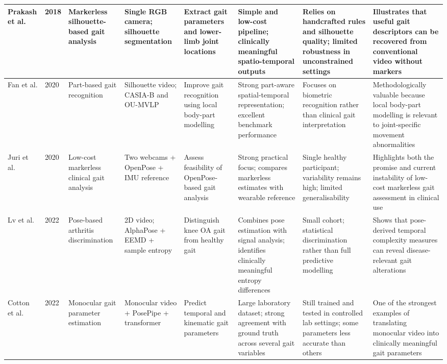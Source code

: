 \documentclass[12pt]{elsarticle}
\begin{document}
{\begin{longtable}{p{1.8cm} p{0.8cm} p{1.4cm} p{1.8cm} p{2.0cm} p{2.2cm} p{2.2cm} p{3.3cm}}
Prakash et al. \cite{prakash2018vision}
& 2018
& Markerless silhouette-based gait analysis
& Single RGB camera; silhouette segmentation
& Extract gait parameters and lower-limb joint locations
& Simple and low-cost pipeline; clinically meaningful spatio-temporal outputs
& Relies on handcrafted rules and silhouette quality; limited robustness in unconstrained settings
& Illustrates that useful gait descriptors can be recovered from conventional video without markers \\
\hline

Fan et al. \cite{fan2020gaitpart}
& 2020
& Part-based gait recognition
& Silhouette video; CASIA-B and OU-MVLP
& Improve gait recognition using local body-part modelling
& Strong part-aware spatial-temporal representation; excellent benchmark performance
& Focuses on biometric recognition rather than clinical gait interpretation
& Methodologically valuable because local body-part modelling is relevant to joint-specific movement abnormalities \\
\hline

Juri et al. \cite{juri2020characterization}
& 2020
& Low-cost markerless clinical gait analysis
& Two webcams + OpenPose + IMU reference
& Assess feasibility of OpenPose-based gait analysis
& Strong practical focus; compares markerless estimates with wearable reference
& Single healthy participant; variability remains high; limited generalisability
& Highlights both the promise and current instability of low-cost markerless gait assessment in clinical use \\
\hline

Lv et al. \cite{lv2022analysis}
& 2022
& Pose-based arthritis discrimination
& 2D video; AlphaPose + EEMD + sample entropy
& Distinguish knee OA gait from healthy gait
& Combines pose estimation with signal analysis; identifies clinically meaningful entropy differences
& Small cohort; statistical discrimination rather than full predictive modelling
& Shows that pose-derived temporal complexity measures can reveal disease-relevant gait alterations \\
\hline

Cotton et al. \cite{cotton2022transforming}
& 2022
& Monocular gait parameter estimation
& Monocular video + PosePipe + transformer
& Predict temporal and kinematic gait parameters
& Large laboratory dataset; strong agreement with ground truth across several gait variables
& Still trained and tested in controlled lab settings; some parameters less accurate than others
& One of the strongest examples of translating monocular video into clinically meaningful gait parameters \\
\hline


\end{longtable}}
\end{document}
